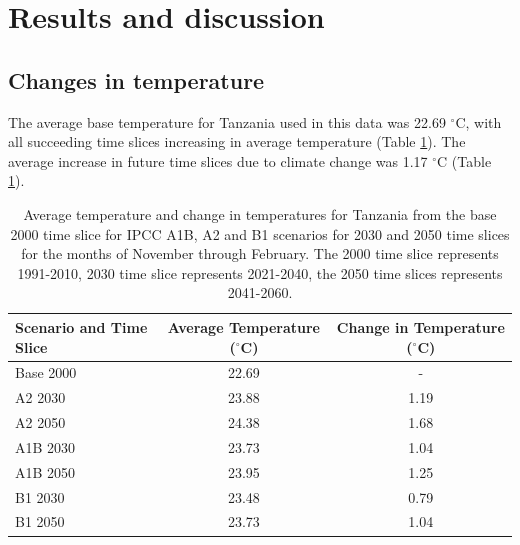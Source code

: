 \documentclass[preprint,review,12pt]{elsarticle}
\begin{document}
    \section{Results and discussion}
    
    \subsection{Changes in temperature}
    The average base temperature for Tanzania used in this data was 22.69 $^{\circ}$C, with all succeeding time slices increasing in average temperature (Table \ref{tab:change}). The average increase in future time slices due to climate change was 1.17 $^{\circ}$C (Table \ref{tab:change}).
    
    \begin{table}[h]
    \begin{tabular}{@{}lcc@{}}
    \toprule
        Scenario and Time Slice      & Average Temperature ($^{\circ}$C) & Change in Temperature ($^{\circ}$C) \\ \midrule
    Base 2000 & 22.69                             & -                                   \\
    A2 2030  & 23.88                            & 1.19                                \\
    A2 2050  & 24.38                             & 1.68                                \\
    A1B 2030   & 23.73                             & 1.04                                \\
    A1B 2050   & 23.95                             & 1.25                                \\
    B1 2030   & 23.48                             & 0.79                                \\
    B1 2050   & 23.73                             & 1.04                                \\ \bottomrule
    \end{tabular}
    
    \caption{Average temperature and change in temperatures  for Tanzania from the base 2000 time slice for IPCC A1B, A2 and B1 scenarios for 2030 and 2050 time slices for the months of November through February. The 2000 time slice represents 1991-2010, 2030 time slice represents 2021-2040, the 2050 time slices represents 2041-2060.}
    \label{tab:change}
    \end{table}
    
\end{document}
